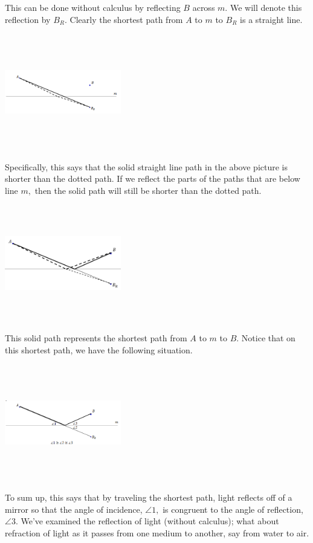 This can be done without calculus by reflecting $B$ across $m.$  We will
denote this reflection by $B_R.$  Clearly the shortest path from $A$ to $m$
to $B_R$ is a straight line.

\includegraphics*[height=2in,width=2in]{Figures/Fermat2}

Specifically, this says that the solid straight line path in the above
picture is shorter than the dotted path.  If we reflect the parts of
the paths that are below line $m,$ then the solid path will still be
shorter than the dotted path. 

\includegraphics*[height=2in,width=2in]{Figures/Fermat3}

This solid path represents the shortest path from $A$ to $m$ to $B.$
Notice that on this shortest path, we have the following situation.

\includegraphics*[height=2in,width=2in]{Figures/Fermat4}

To sum up, this says that by traveling the shortest path, light
reflects off of a mirror so that the angle of incidence, $\angle 1,$ is
congruent to the angle of reflection, $\angle 3.$  We’ve examined the
reflection of light (without calculus); what about refraction of light
as it passes from one medium to another, say from water to air.

